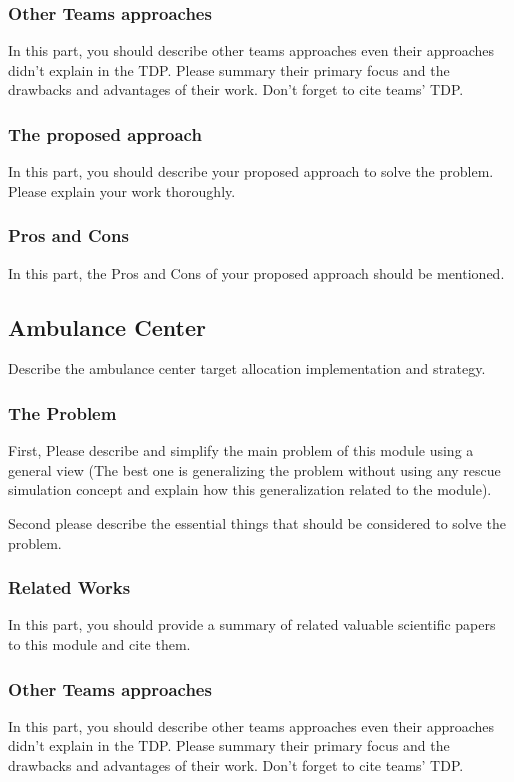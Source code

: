 \documentclass[runningheads,a4paper]{llncs}
\begin{document}
\subsubsection{Other Teams approaches}
In this part, you should describe other teams approaches even their approaches didn't explain in the TDP. Please summary their primary focus and the drawbacks and advantages of their work. Don't forget to cite teams' TDP.
\subsubsection{The proposed approach}
In this part, you should describe your proposed approach to solve the problem. Please explain your work thoroughly.
\subsubsection{Pros and Cons}
In this part, the Pros and Cons of your proposed approach should be mentioned.

\subsection{Ambulance Center}
Describe the ambulance center target allocation implementation and strategy.
\subsubsection{The Problem}
First, Please describe and simplify the main problem of this module using a general view (The best one is generalizing the problem without using any rescue simulation concept and explain how this generalization related to the module).

Second please describe the essential things that should be considered to solve the problem.
\subsubsection{Related Works}
In this part, you should provide a summary of related valuable scientific papers to this module and cite them.
\subsubsection{Other Teams approaches}
In this part, you should describe other teams approaches even their approaches didn't explain in the TDP. Please summary their primary focus and the drawbacks and advantages of their work. Don't forget to cite teams' TDP.
\end{document}
